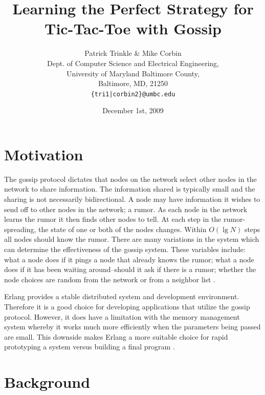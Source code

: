 \documentclass[11pt,twocolumn]{article}
\title{Learning the Perfect Strategy for Tic-Tac-Toe with Gossip}
\author{Patrick Trinkle \& Mike Corbin\\
Dept. of Computer Science and Electrical Engineering,\\
University of Maryland Baltimore County,\\
Baltimore, MD, 21250\\
\texttt{\{tri1|corbin2\}@umbc.edu}}
\date{December 1st, 2009}
\begin{document}

\section{Motivation}

The gossip protocol dictates that nodes on the network select other nodes in the network to share information.  The information shared is typically small and the sharing is not necessarily bidirectional.  A node may have information it wishes to send off to other nodes in the network; a rumor.  As each node in the network learns the rumor it then finds other nodes to tell.  At each step in the rumor-spreading, the state of one or both of the nodes changes.  Within $O(\lg N)$ steps all nodes should know the rumor.  There are many variations in the system which can determine the effectiveness of the gossip system.  These variables include: what a node does if it pings a node that already knows the rumor; what a node does if it has been waiting around--should it ask if there is a rumor; whether the node choices are random from the network or from a neighbor list \cite{Birm2007}.

Erlang provides a stable distributed system and development environment.  Therefore it is a good choice for developing applications that utilize the gossip protocol.  However, it does have a limitation with the memory management system whereby it works much more efficiently when the parameters being passed are small.  This downside makes Erlang a more suitable choice for rapid prototyping a system versus building a final program \cite{Erlang}.

\section{Background}
\end{document}
